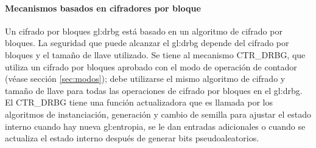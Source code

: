 %
%
\paragraph{Mecanismos basados en cifradores por bloque}

Un cifrado por bloques \gls{gl:drbg} está basado en un algoritmo de cifrado por
bloques. La seguridad que puede alcanzar el \gls{gl:drbg} depende del cifrado
por bloques y el tamaño de llave utilizado. Se tiene al mecanismo CTR\_DRBG,
que utiliza un cifrado por bloques aprobado con el modo de operación de
contador (véase sección \ref{sec:modos}); debe utilizarse el mismo algoritmo
de cifrado y tamaño de llave para todas las operaciones de cifrado por bloques
en el \gls{gl:drbg}. El CTR\_DRBG tiene una función actualizadora que es llamada
por los algoritmos de instanciación, generación y cambio de semilla para ajustar
el estado interno cuando hay nueva \gls{gl:entropia}, se le dan entradas
adicionales o cuando se actualiza el estado interno después de generar bits
pseudoaleatorios.